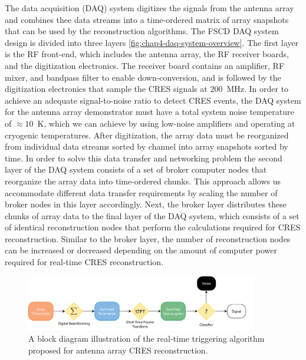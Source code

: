 The data acquisition (DAQ) system digitizes the signals from the antenna array and combines thee data streams into a time-ordered matrix of array snapshots that can be used by the reconstruction algorithms. The FSCD DAQ system design \cite{p8daqIII} is divided into three layers \ref{fig:chap4-daq-system-overview}. The first layer is the RF front-end, which includes the antenna array, the RF receiver boards, and the digitization electronics. The receiver board contains an amplifier, RF mixer, and bandpass filter to enable down-conversion, and is followed by the digitization electronics that sample the CRES signals at 200~MHz. In order to achieve an adequate signal-to-noise ratio to detect CRES events, the DAQ system for the antenna array demonstrator must have a total system noise temperature of $\approx 10$~K, which we can achieve by using low-noise amplifiers and operating at cryogenic temperatures. After digitization, the array data must be reorganized from individual data streams sorted by channel into array snapshots sorted by time. In order to solve this data transfer and networking problem the second layer of the DAQ system consists of a set of broker computer nodes that reorganize the array data into time-ordered chunks. This approach allows us accommodate different data transfer requirements by scaling the number of broker nodes in this layer accordingly. Next, the broker layer distributes these chunks of array data to the final layer of the DAQ system, which consists of a set of identical reconstruction nodes that perform the calculations required for CRES reconstruction. Similar to the broker layer, the number of reconstruction nodes can be increased or decreased depending on the amount of computer power required for real-time CRES reconstruction.


\begin{figure}[htbp]
    \centering
    \includegraphics[width=0.9\textwidth]{figs/Chapter-4/230316_trigger_flowchart.png}
    \caption{A block diagram illustration of the real-time triggering algorithm proposed for antenna array CRES reconstruction.}
    \label{fig:signal_detection_routine}
\end{figure}

